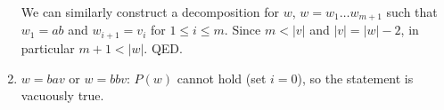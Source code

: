 \begin{exercise}{}
\begin{solution}
\begin{enumerate}
      We can similarly construct a decomposition for \(w\), \(w = w_1\ldots
      w_{m+1}\) such that \(w_1 = ab\) and \(w_{i + 1} = v_i\) for \(1 \le i \le
      m\). Since \(m < |v|\) and \(|v| = |w| - 2\), in particular \(m + 1 <
      |w|\). QED.

      \item \(w = bav\) or \(w = bbv\): \(P(w)\) cannot hold (set \(i = 0\)), so
      the statement is vacuously true. 
    \end{enumerate}
  \end{solution}
  
\end{exercise}
